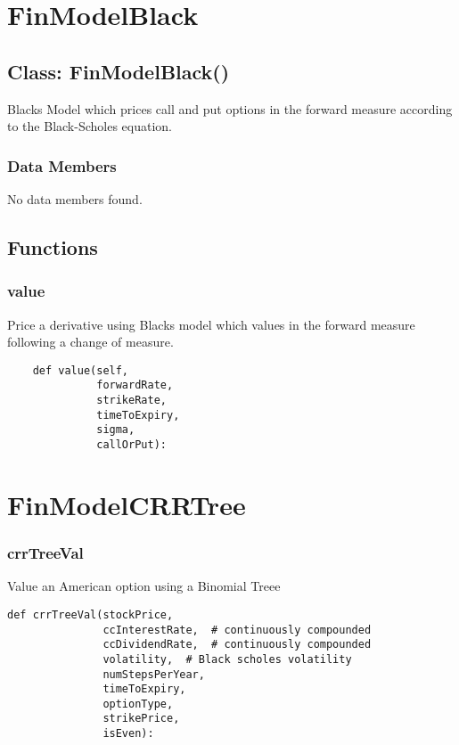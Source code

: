 \documentclass[twoside,11pt]{book}
\begin{document}
\newpage
\section{FinModelBlack}

\subsection*{Class: FinModelBlack()}
Blacks Model which prices call and put options in the forward measure according to the Black-Scholes equation.  

\subsubsection*{Data Members}
No data members found.

\subsection*{Functions}

\subsubsection*{{\bf value}}
Price a derivative using Blacks model which values in the forward measure following a change of measure.  

\begin{lstlisting}
    def value(self,
              forwardRate,
              strikeRate,
              timeToExpiry,
              sigma,
              callOrPut):
\end{lstlisting}

\newpage
\section{FinModelCRRTree}

\subsubsection*{{\bf crrTreeVal}}
Value an American option using a Binomial Treee  

\begin{lstlisting}
def crrTreeVal(stockPrice,
               ccInterestRate,  # continuously compounded
               ccDividendRate,  # continuously compounded
               volatility,  # Black scholes volatility
               numStepsPerYear,
               timeToExpiry,
               optionType,
               strikePrice,
               isEven):
\end{lstlisting}
\end{document}
